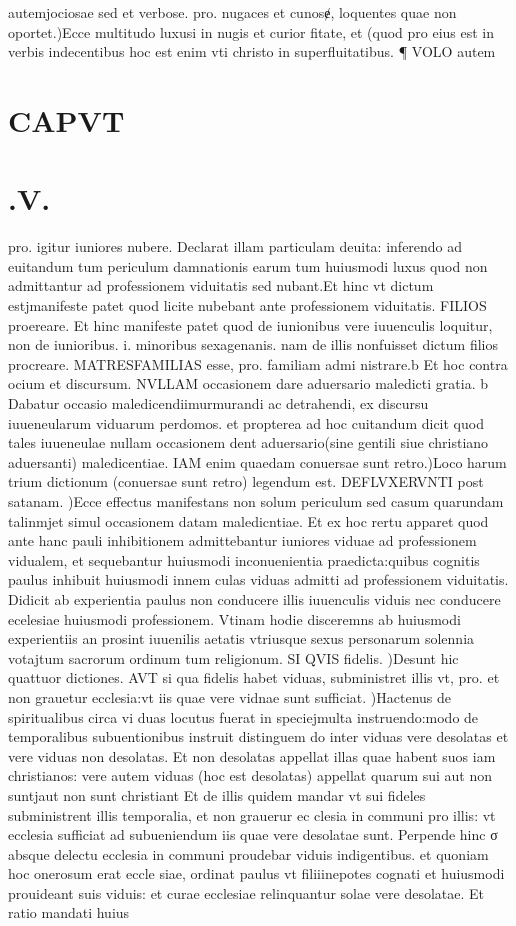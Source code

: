 \documentclass{article}
\begin{document}
\begin{pages}
autemjociosae sed et verbose. pro. nugaces et cunosɇ, loquentes quae non oportet.)Ecce multitudo luxusi in nugis et curior fitate, et (quod pro eius est in verbis indecentibus hoc est enim vti christo in superfluitatibus. ¶ VOLO autem  \pend
\section*{CAPVT }
\section*{.V. }
\marginpar{[ p.143 ]}\pstart pro. igitur iuniores nubere. Declarat illam particulam deuita: inferendo ad euitandum tum periculum damnationis earum tum huiusmodi luxus quod non admittantur ad professionem viduitatis sed nubant.Et hinc vt dictum estjmanifeste patet quod licite nubebant ante professionem viduitatis. FILIOS proereare. Et hinc manifeste patet quod de iunionibus vere iuuenculis loquitur, non de iunioribus. i. minoribus sexagenanis. nam de illis nonfuisset dictum filios procreare. MATRESFAMILIAS esse, pro. familiam admi nistrare.b Et hoc contra ocium et discursum. NVLLAM occasionem dare aduersario maledicti gratia. b Dabatur occasio maledicendiimurmurandi ac detrahendi, ex discursu iuueneularum viduarum perdomos. et propterea ad hoc cuitandum dicit quod tales iuueneulae nullam occasionem dent aduersario(sine gentili siue christiano aduersanti) maledicentiae. IAM enim quaedam conuersae sunt retro.)Loco harum trium dictionum (conuersae sunt retro) legendum est. DEFLVXERVNTI post satanam. )Ecce effectus manifestans non solum periculum sed casum quarundam talinmjet simul occasionem datam maledicntiae. Et ex hoc rertu apparet quod ante hanc pauli inhibitionem admittebantur iuniores viduae ad professionem vidualem, et sequebantur huiusmodi inconuenientia praedicta:quibus cognitis paulus inhibuit huiusmodi innem culas viduas admitti ad professionem viduitatis. Didicit ab experientia paulus non conducere illis iuuenculis viduis nec conducere ecelesiae huiusmodi professionem. Vtinam hodie disceremns ab huiusmodi experientiis an prosint iuuenilis aetatis vtriusque sexus personarum solennia votajtum sacrorum ordinum tum religionum.  \pend\pstart SI QVIS fidelis. )Desunt hic quattuor dictiones. AVT si qua fidelis habet viduas, subministret illis vt, pro. et non grauetur ecclesia:vt iis quae vere vidnae sunt sufficiat. )Hactenus de spiritualibus circa vi duas locutus fuerat in speciejmulta instruendo:modo de temporalibus subuentionibus instruit distinguem do inter viduas vere desolatas et vere viduas non desolatas. Et non desolatas appellat illas quae habent suos iam christianos: vere autem viduas (hoc est desolatas) appellat quarum sui aut non suntjaut non sunt christiant Et de illis quidem mandar vt sui fideles subministrent illis temporalia, et non grauerur ec clesia in communi pro illis: vt ecclesia sufficiat ad subueniendum iis quae vere desolatae sunt. Perpende hinc σ absque delectu ecclesia in communi proudebar viduis indigentibus. et quoniam hoc onerosum erat eccle siae, ordinat paulus vt filiiinepotes cognati et huiusmodi prouideant suis viduis: et curae ecclesiae relinquantur solae vere desolatae. Et ratio mandati huius 
\end{pages}
\end{document}
